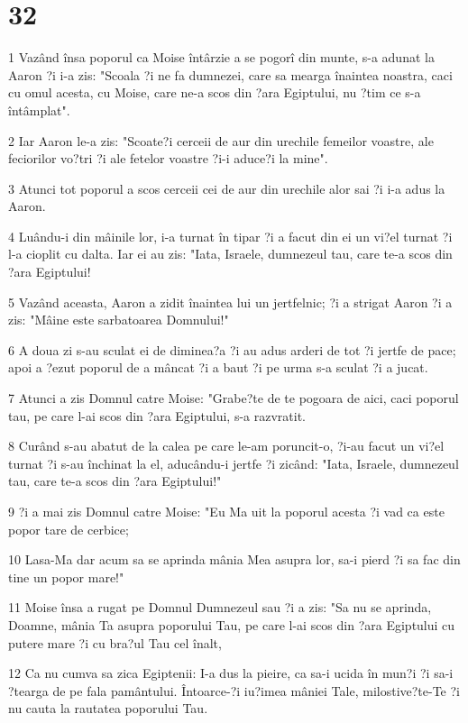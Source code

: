 \chapter{32}

\par 1 Vazând însa poporul ca Moise întârzie a se pogorî din munte, s-a adunat la Aaron ?i i-a zis: "Scoala ?i ne fa dumnezei, care sa mearga înaintea noastra, caci cu omul acesta, cu Moise, care ne-a scos din ?ara Egiptului, nu ?tim ce s-a întâmplat".
\par 2 Iar Aaron le-a zis: "Scoate?i cerceii de aur din urechile femeilor voastre, ale feciorilor vo?tri ?i ale fetelor voastre ?i-i aduce?i la mine".
\par 3 Atunci tot poporul a scos cerceii cei de aur din urechile alor sai ?i i-a adus la Aaron.
\par 4 Luându-i din mâinile lor, i-a turnat în tipar ?i a facut din ei un vi?el turnat ?i l-a cioplit cu dalta. Iar ei au zis: "Iata, Israele, dumnezeul tau, care te-a scos din ?ara Egiptului!
\par 5 Vazând aceasta, Aaron a zidit înaintea lui un jertfelnic; ?i a strigat Aaron ?i a zis: "Mâine este sarbatoarea Domnului!"
\par 6 A doua zi s-au sculat ei de diminea?a ?i au adus arderi de tot ?i jertfe de pace; apoi a ?ezut poporul de a mâncat ?i a baut ?i pe urma s-a sculat ?i a jucat.
\par 7 Atunci a zis Domnul catre Moise: "Grabe?te de te pogoara de aici, caci poporul tau, pe care l-ai scos din ?ara Egiptului, s-a razvratit.
\par 8 Curând s-au abatut de la calea pe care le-am poruncit-o, ?i-au facut un vi?el turnat ?i s-au închinat la el, aducându-i jertfe ?i zicând: "Iata, Israele, dumnezeul tau, care te-a scos din ?ara Egiptului!"
\par 9 ?i a mai zis Domnul catre Moise: "Eu Ma uit la poporul acesta ?i vad ca este popor tare de cerbice;
\par 10 Lasa-Ma dar acum sa se aprinda mânia Mea asupra lor, sa-i pierd ?i sa fac din tine un popor mare!"
\par 11 Moise însa a rugat pe Domnul Dumnezeul sau ?i a zis: "Sa nu se aprinda, Doamne, mânia Ta asupra poporului Tau, pe care l-ai scos din ?ara Egiptului cu putere mare ?i cu bra?ul Tau cel înalt,
\par 12 Ca nu cumva sa zica Egiptenii: I-a dus la pieire, ca sa-i ucida în mun?i ?i sa-i ?tearga de pe fala pamântului. Întoarce-?i iu?imea mâniei Tale, milostive?te-Te ?i nu cauta la rautatea poporului Tau.
